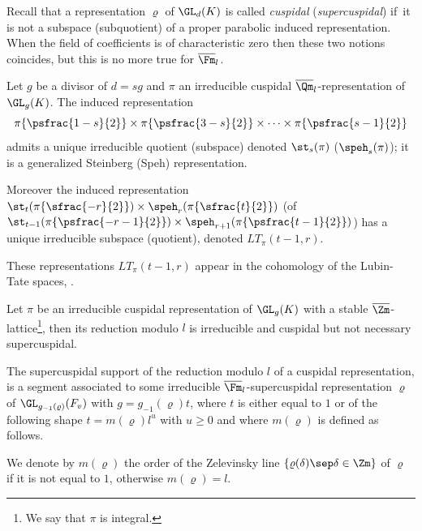 Recall that a representation
$\varrho$ of $\GL_d(K)$ is called \emph{cuspidal} (\resp \emph{supercuspidal})
if~it is not a subspace (\resp subquotient) of a proper parabolic induced representation.
When the field of coefficients is of characteristic zero then these two notions coincides,
but this is no more true for $\overline \Fm_l$.

\begin{defin} \label{defi-rep}
Let $g$ be a divisor of $d=sg$ and $\pi$ an irreducible cuspidal
$\overline \Qm_l$-representation of $\GL_g(K)$.
The induced representation
\[
\pi\{\psfrac{1-s}{2}\} \times \pi \{\psfrac{3-s}{2}\} \times \cdots \times \pi \{\psfrac{s-1}{2}\}
\]
admits a unique irreducible quotient (\resp subspace) denoted $\st_s(\pi)$ (\resp $\speh_s(\pi)$); it is a generalized Steinberg (\resp Speh) representation.

Moreover the induced representation $\st_t(\pi \{\sfrac{-r}{2}\}) \times \speh_r(\pi \{\sfrac{t}{2}\})$
(\resp of $\st_{t-1}(\pi \{\psfrac{-r-1}{2}\}) \times \speh_{r+1}(\pi \{\psfrac{t-1}{2}\})$)
has a unique irreducible subspace (\resp quotient), denoted
$LT_\pi(t-1,r)$.
\end{defin}

\begin{remark}
These representations $LT_\pi(t-1,r)$ appear in the cohomology of the Lubin-Tate
spaces, \cf \cite{boyer-invent2}.
\end{remark}

\begin{prop} \label{prop-red-modl}
Let $\pi$ be an irreducible cuspidal representation of $\GL_g(K)$ with a stable
$\overline \Zm$-lattice\footnote{We say that $\pi$ is integral.}, then its reduction modulo $l$
is irreducible and cuspidal but not necessary supercuspidal.
\end{prop}

The supercuspidal support of the reduction modulo $l$ of a cuspidal representation,
is a segment associated to some irreducible $\overline \Fm_l$-supercuspidal representation
$\varrho$ of $\GL_{g_{-1}(\varrho)}(F_v)$ with $g=g_{-1}(\varrho) t$, where $t$ is
either equal to $1$ or of the following shape
$t=m(\varrho)l^u$ with $u \geq 0$ and where $m(\varrho)$ is defined as follows.

\begin{nota} \label{nota-mvarrho}
We denote by $m(\varrho)$ the order of the Zelevinsky line
$\{\varrho(\delta)\sep \delta \in \Zm\}$ of
$\varrho$ if it is not equal to $1$, otherwise $m(\varrho)=l$.
\end{nota}

